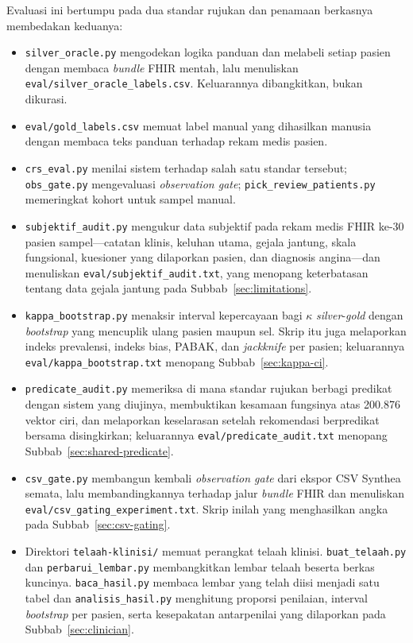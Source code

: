 Evaluasi ini bertumpu pada dua standar rujukan dan penamaan berkasnya membedakan keduanya:

\begin{itemize}
  \item \texttt{silver\_oracle.py} mengodekan logika panduan dan melabeli setiap
  pasien dengan membaca \emph{bundle} FHIR mentah, lalu menuliskan
  \texttt{eval/silver\_oracle\_labels.csv}. Keluarannya dibangkitkan, bukan dikurasi.
  \item \texttt{eval/gold\_labels.csv} memuat label manual yang dihasilkan manusia
  dengan membaca teks panduan terhadap rekam medis pasien.
  \item \texttt{crs\_eval.py} menilai sistem terhadap salah satu standar tersebut;
  \texttt{obs\_gate.py} mengevaluasi \emph{observation gate};
  \texttt{pick\_review\_patients.py} memeringkat kohort untuk sampel manual.
  \item \texttt{subjektif\_audit.py} mengukur data subjektif pada rekam medis FHIR ke-30
  pasien sampel---catatan klinis, keluhan utama, gejala jantung, skala fungsional, kuesioner
  yang dilaporkan pasien, dan diagnosis angina---dan menuliskan
  \texttt{eval/subjektif\_audit.txt}, yang menopang keterbatasan tentang data gejala jantung
  pada Subbab~\ref{sec:limitations}.
  \item \texttt{kappa\_bootstrap.py} menaksir interval kepercayaan bagi $\kappa$
  \emph{silver}-\emph{gold} dengan \emph{bootstrap} yang mencuplik ulang pasien maupun sel. Skrip itu juga melaporkan indeks prevalensi, indeks bias, PABAK, dan \emph{jackknife} per pasien;
  keluarannya \texttt{eval/kappa\_bootstrap.txt} menopang Subbab~\ref{sec:kappa-ci}.
  \item \texttt{predicate\_audit.py} memeriksa di mana standar rujukan berbagi predikat
  dengan sistem yang diujinya, membuktikan kesamaan fungsinya atas 200.876 vektor ciri, dan
  melaporkan keselarasan setelah rekomendasi berpredikat bersama disingkirkan; keluarannya
  \texttt{eval/predicate\_audit.txt} menopang Subbab~\ref{sec:shared-predicate}.
  \item \texttt{csv\_gate.py} membangun kembali \emph{observation gate} dari ekspor CSV
  Synthea semata, lalu membandingkannya terhadap jalur \emph{bundle} FHIR dan menuliskan
  \texttt{eval/csv\_gating\_experiment.txt}. Skrip inilah yang menghasilkan angka pada
  Subbab~\ref{sec:csv-gating}.
  \item Direktori \texttt{telaah-klinisi/} memuat perangkat telaah klinisi.
  \texttt{buat\_telaah.py} dan \texttt{perbarui\_lembar.py} membangkitkan lembar telaah
  beserta berkas kuncinya. \texttt{baca\_hasil.py} membaca lembar yang telah diisi menjadi satu
  tabel dan \texttt{analisis\_hasil.py} menghitung proporsi penilaian, interval
  \emph{bootstrap} per pasien, serta kesepakatan antarpenilai yang dilaporkan pada
  Subbab~\ref{sec:clinician}.
\end{itemize}


